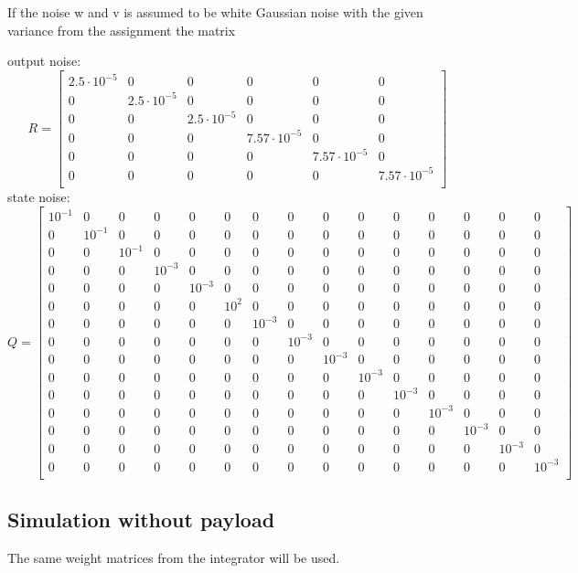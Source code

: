 If the noise w and v is assumed to be white Gaussian noise with the given variance from the assignment the matrix

output noise:
$$
R=\begin{bmatrix}
2.5 \cdot 10^{-5} & 0 & 0 & 0 & 0 & 0 \\
0 & 2.5 \cdot 10^{-5} & 0 & 0 & 0 & 0 \\
0 & 0 & 2.5 \cdot 10^{-5} & 0 & 0 & 0 \\
0 & 0 & 0 & 7.57 \cdot 10^{-5} & 0 & 0 \\
0 & 0 & 0 & 0 & 7.57 \cdot 10^{-5} & 0 \\
0 & 0 & 0 & 0 & 0 & 7.57 \cdot 10^{-5} \\
\end{bmatrix}
$$
state noise:
$$
Q=\begin{bmatrix}
10^{-1} & 0 & 0 & 0 & 0 & 0 & 0 & 0 & 0 & 0 & 0 & 0 & 0 & 0 & 0 \\
0 & 10^{-1} & 0 & 0 & 0 & 0 & 0 & 0 & 0 & 0 & 0 & 0 & 0 & 0 & 0 \\
0 & 0 & 10^{-1} & 0 & 0 & 0 & 0 & 0 & 0 & 0 & 0 & 0 & 0 & 0 & 0 \\
0 & 0 & 0 & 10^{-3} & 0 & 0 & 0 & 0 & 0 & 0 & 0 & 0 & 0 & 0 & 0 \\
0 & 0 & 0 & 0 & 10^{-3} & 0 & 0 & 0 & 0 & 0 & 0 & 0 & 0 & 0 & 0 \\
0 & 0 & 0 & 0 & 0 & 10^2 & 0 & 0 & 0 & 0 & 0 & 0 & 0 & 0 & 0 \\
0 & 0 & 0 & 0 & 0 & 0 & 10^{-3} & 0 & 0 & 0 & 0 & 0 & 0 & 0 & 0 \\
0 & 0 & 0 & 0 & 0 & 0 & 0 & 10^{-3} & 0 & 0 & 0 & 0 & 0 & 0 & 0 \\
0 & 0 & 0 & 0 & 0 & 0 & 0 & 0 & 10^{-3} & 0 & 0 & 0 & 0 & 0 & 0 \\
0 & 0 & 0 & 0 & 0 & 0 & 0 & 0 & 0 & 10^{-3} & 0 & 0 & 0 & 0 & 0 \\
0 & 0 & 0 & 0 & 0 & 0 & 0 & 0 & 0 & 0 & 10^{-3} & 0 & 0 & 0 & 0 \\
0 & 0 & 0 & 0 & 0 & 0 & 0 & 0 & 0 & 0 & 0 & 10^{-3} & 0 & 0 & 0 \\
0 & 0 & 0 & 0 & 0 & 0 & 0 & 0 & 0 & 0 & 0 & 0 & 10^{-3} & 0 & 0 \\
0 & 0 & 0 & 0 & 0 & 0 & 0 & 0 & 0 & 0 & 0 & 0 & 0 & 10^{-3} & 0 \\
0 & 0 & 0 & 0 & 0 & 0 & 0 & 0 & 0 & 0 & 0 & 0 & 0 & 0 & 10^{-3} \\
\end{bmatrix}
$$

\subsection{Simulation without payload}
The same weight matrices from the integrator will be used.

